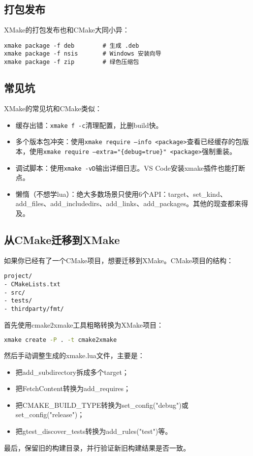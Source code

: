 \subsection{打包发布}
XMake的打包发布也和CMake大同小异：
\begin{lstlisting}
xmake package -f deb        # 生成 .deb
xmake package -f nsis       # Windows 安装向导
xmake package -f zip        # 绿色压缩包
\end{lstlisting}

\subsection{常见坑}
XMake的常见坑和CMake类似：
\begin{itemize}
  \item 缓存出错：\texttt{xmake f -c}清理配置，比删build快。
  \item 多个版本包冲突：使用\texttt{xmake require --info <package>}查看已经缓存的包版本，使用\texttt{xmake require --extra="\{debug=true\}" <package>}强制重装。
  \item 调试脚本：使用\texttt{xmake -vD}输出详细日志。VS Code安装xmake插件也能打断点。
  \item 懒惰（不想学lua）：绝大多数场景只使用6个API：target、set\_kind、add\_files、add\_includedirs、add\_links、add\_packages。其他的现查都来得及。
\end{itemize}

\subsection{从CMake迁移到XMake}
如果你已经有了一个CMake项目，想要迁移到XMake。CMake项目的结构：
\begin{lstlisting}
project/
- CMakeLists.txt
- src/
- tests/
- thirdparty/fmt/
\end{lstlisting}

首先使用cmake2xmake工具粗略转换为XMake项目：
\begin{lstlisting}[language=bash]
    xmake create -P . -t cmake2xmake
\end{lstlisting}
然后手动调整生成的xmake.lua文件，主要是：
\begin{itemize}
  \item 把add\_subdirectory拆成多个target；
  \item 把FetchContent转换为add\_requires；
  \item 把CMAKE\_BUILD\_TYPE转换为set\_config("debug")或set\_config("release")；
  \item 把gtest\_discover\_tests转换为add\_rules("test")等。
\end{itemize}
最后，保留旧的构建目录，并行验证新旧构建结果是否一致。

